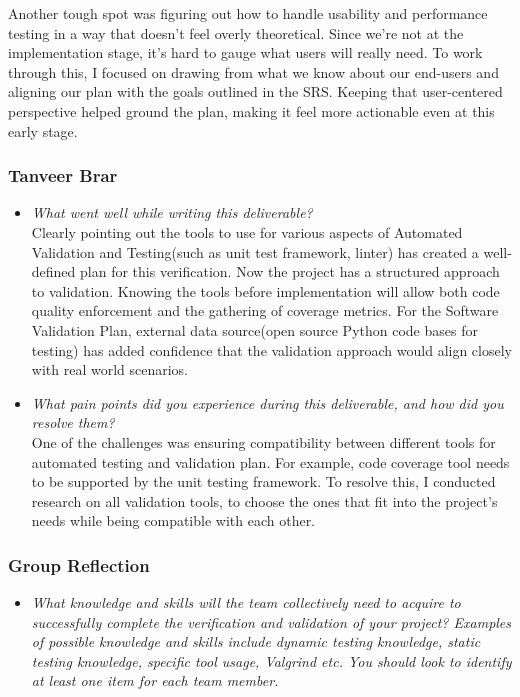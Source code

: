 \documentclass[12pt, titlepage]{article}
\begin{document}
\begin{appendices}
\begin{itemize}
  Another tough spot was figuring out how to handle usability and performance 
  testing in a way that doesn’t feel overly theoretical. Since we’re not at the 
  implementation stage, it’s hard to gauge what users will really need. To work 
  through this, I focused on drawing from what we know about our end-users and 
  aligning our plan with the goals outlined in the SRS. Keeping that user-centered 
  perspective helped ground the plan, making it feel more actionable even at this 
  early stage.

\subsubsection*{Tanveer Brar}
\begin{itemize}
    \item \textit{What went well while writing this deliverable?} \\

    Clearly pointing out the tools to use for various aspects of Automated Validation and Testing(such as unit test framework, linter) has created a well-defined plan for this verification. Now the project has a structured approach to validation. Knowing the tools before implementation will allow both code quality enforcement and the gathering of coverage metrics. For the Software Validation Plan, external data source(open source Python code bases for testing) has added confidence that the validation approach would align closely with real world scenarios.

    \item \textit{What pain points did you experience during this deliverable, and how did you resolve them?}\\

    One of the challenges was ensuring compatibility between different tools for automated testing and validation plan. For example, code coverage tool needs to be supported by the unit testing framework. To resolve this, I conducted research on all validation tools, to choose the ones that fit into the project's needs while being compatible with each other.

\end{itemize}

\subsubsection*{Group Reflection}
\begin{itemize}
  \item \textit{What knowledge and skills will the team collectively need to acquire to
  successfully complete the verification and validation of your project?
  Examples of possible knowledge and skills include dynamic testing knowledge,
  static testing knowledge, specific tool usage, Valgrind etc.  You should look to
  identify at least one item for each team member.\\} 
  

\end{itemize}
\end{itemize}
\end{appendices}
\end{document}
